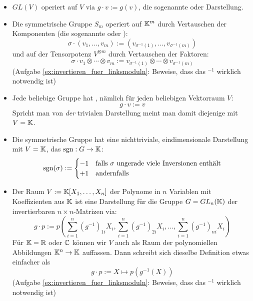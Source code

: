\begin{example}
\begin{itemize}
\item $GL(V)$ operiert auf $V$ via $g\cdot v := g(v)$, die sogenannte  oder  Darstellung.
\item Die symmetrische Gruppe $S_m$ operiert auf $\mathbb{K}^m$ durch Vertauschen der Komponenten (die sogenannte  oder ):
\[\sigma \cdot (v_1,\ldots,v_m) := (v_{\sigma^{-1}(1)}, \ldots, v_{\sigma^{-1}(m)})\]
und auf der Tensorpotenz $V^{\otimes m}$ durch Vertauschen der Faktoren:
\[\sigma \cdot v_1\otimes\cdots\otimes v_m := v_{\sigma^{-1}(1)}\otimes \cdots \otimes v_{\sigma^{-1}(m)} \]
(Aufgabe \ref{ex:invertieren_fuer_linksmoduln}: Beweise, dass das $^{-1}$ wirklich notwendig ist)
\item Jede beliebige Gruppe hat , nämlich für jeden beliebigen Vektorraum $V$:
\[g\cdot v := v\]
Spricht man von \emph{der} trivialen Darstellung meint man damit diejenige mit $V=\mathbb{K}$.
\item Die symmetrische Gruppe hat eine nichttriviale, eindimensionale Darstellung mit $V=\mathbb{K}$, das  $\operatorname{sgn}: G\to\mathbb{K}$:
\[\operatorname{sgn}(\sigma) := \begin{cases} -1 & \text{falls $\sigma$ ungerade viele Inversionen enthält} \\ +1 & \text{andernfalls}\end{cases}\]
\item Der Raum $V:=\mathbb{K}[X_1, \ldots, X_n]$ der Polynome in $n$ Variablen mit Koeffizienten aus $\mathbb{K}$ ist eine Darstellung für die Gruppe $G=GL_n(\mathbb{K})$ der invertierbaren $n\times n$-Matrizen via:
\[g\cdot p := p\left(\sum_{i=1}^n (g^{-1})_{1i} X_i, \sum_{i=1}^n (g^{-1})_{2i} X_i, \ldots, \sum_{i=1}^n (g^{-1})_{ni} X_i\right)\]
Für $\mathbb{K}=\mathbb{R}$ oder $\mathbb{C}$ können wir $V$ auch als Raum der polynomiellen Abbildungen $\mathbb{K}^n \to \mathbb{K}$ auffassen. Dann schreibt sich dieselbe Definition etwas einfacher als
\[g \cdot p := X\mapsto p(g^{-1}(X))\]
(Aufgabe \ref{ex:invertieren_fuer_linksmoduln}: Beweise, dass das $^{-1}$ wirklich notwendig ist)
\end{itemize}
\end{example}


